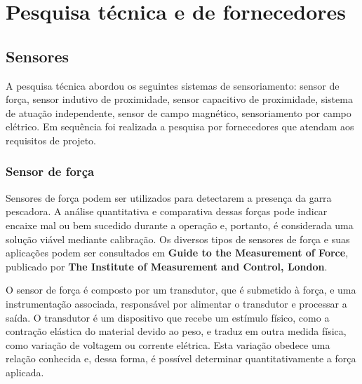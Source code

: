 

\setcounter{secnumdepth}{3}
\section{Pesquisa técnica e de fornecedores}
\label{pesqtec}

\subsection{Sensores}
A pesquisa técnica abordou os seguintes sistemas de sensoriamento: sensor de força, sensor indutivo de proximidade,
 sensor capacitivo de proximidade, sistema de atuação independente, sensor de
 campo magnético, sensoriamento por campo elétrico. Em sequência foi realizada a
 pesquisa por fornecedores que atendam aos requisitos de projeto.
 
\subsubsection{Sensor de força}

 Sensores de força podem ser utilizados para detectarem a presença da garra pescadora. A análise quantitativa e comparativa dessas forças pode indicar encaixe mal ou bem sucedido durante a operação e, portanto, é considerada uma solução viável mediante calibração. Os diversos tipos de sensores de força e suas aplicações podem ser consultados em \textbf{Guide to the Measurement of Force}, publicado por \textbf{The Institute of Measurement and Control, London}.

 O sensor de força é composto por um transdutor, que é submetido à força, e uma instrumentação associada, responsável por alimentar o transdutor e processar a saída. O transdutor é um dispositivo que recebe um estímulo físico, como a contração elástica do material devido ao peso, e traduz em outra medida física, como variação de voltagem ou corrente elétrica. Esta variação obedece uma relação conhecida e, dessa forma, é possível determinar quantitativamente a força aplicada.

